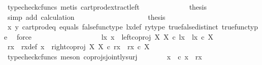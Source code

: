 \begin{isabellebody}
\ {\isacharparenleft}{\kern0pt}typecheck{\isacharunderscore}{\kern0pt}cfuncs{\isacharcomma}{\kern0pt}\ metis\ cart{\isacharunderscore}{\kern0pt}prod{\isacharunderscore}{\kern0pt}extract{\isacharunderscore}{\kern0pt}left{\isacharparenright}{\kern0pt}\isanewline
\ \ \ \ \ \ \ \ \ \ \isamarkupfalse%
\ \isamarkupfalse%
\ {\isacharquery}{\kern0pt}thesis\isanewline
\ \ \ \ \ \ \ \ \ \ \ \ \isamarkupfalse%
\ {\isacharparenleft}{\kern0pt}simp\ add{\isacharcolon}{\kern0pt}\ calculation{\isacharparenright}{\kern0pt}\isanewline
\ \ \ \ \ \ \ \ \isamarkupfalse%
\isanewline
\ \ \ \ \ \ \ \ \isamarkupfalse%
\ \isamarkupfalse%
\ {\isacharquery}{\kern0pt}thesis\isanewline
\ \ \ \ \ \ \ \ \ \ \isamarkupfalse%
\ {\isasymrho}x\ {\isasymrho}y\ cart{\isacharunderscore}{\kern0pt}prod{\isacharunderscore}{\kern0pt}eq{}\ equals\ false{\isacharunderscore}{\kern0pt}func{\isacharunderscore}{\kern0pt}type\ lx{\isacharunderscore}{\kern0pt}def\ ry{\isacharunderscore}{\kern0pt}type\ true{\isacharunderscore}{\kern0pt}false{\isacharunderscore}{\kern0pt}distinct\ true{\isacharunderscore}{\kern0pt}func{\isacharunderscore}{\kern0pt}type\ \isamarkupfalse%
\ force\isanewline
\ \ \ \ \ \ \isamarkupfalse%
\isanewline
\ \ \ \ \isamarkupfalse%
\isanewline
\ \ \ \ \ \ \isamarkupfalse%
\ {\isachardoublequoteopen}{\isasymnexists}lx{\isachardot}{\kern0pt}\ x\ {\isacharequal}{\kern0pt}\ left{\isacharunderscore}{\kern0pt}coproj\ X\ X\ {\isasymcirc}\isactrlsub c\ lx\ {\isasymand}\ lx\ {\isasymin}\isactrlsub c\ X{\isachardoublequoteclose}\isanewline
\ \ \ \ \ \ \isamarkupfalse%
\ \isamarkupfalse%
\ rx\ \ rx{\isacharunderscore}{\kern0pt}def{\isacharcolon}{\kern0pt}\ {\isachardoublequoteopen}x\ {\isacharequal}{\kern0pt}\ right{\isacharunderscore}{\kern0pt}coproj\ X\ X\ {\isasymcirc}\isactrlsub c\ rx\ {\isasymand}\ rx\ {\isasymin}\isactrlsub c\ X{\isachardoublequoteclose}\isanewline
\ \ \ \ \ \ \ \ \isamarkupfalse%
\ {\isacharparenleft}{\kern0pt}typecheck{\isacharunderscore}{\kern0pt}cfuncs{\isacharcomma}{\kern0pt}\ meson\ coprojs{\isacharunderscore}{\kern0pt}jointly{\isacharunderscore}{\kern0pt}surj{\isacharparenright}{\kern0pt}\isanewline
\ \ \ \ \ \ \isamarkupfalse%
\ {\isasymrho}x{\isacharcolon}{\kern0pt}\ {\isachardoublequoteopen}{\isasymrho}\ {\isasymcirc}\isactrlsub c\ x\ {\isacharequal}{\kern0pt}\ {\isasymlangle}rx{\isacharcomma}{\kern0pt}\ {\isasymf}{\isasymrangle}{\isachardoublequoteclose}\isanewline

\end{isabellebody}
